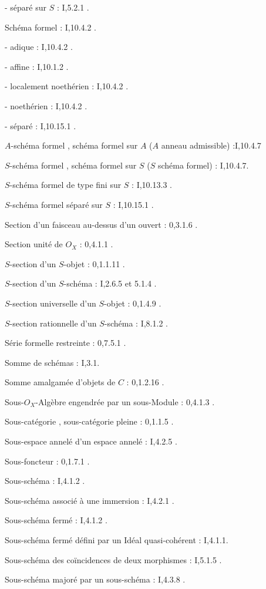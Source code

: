 - séparé sur $S$ : I,5.2.1 .

 Schéma formel : I,10.4.2 .

- adique : I,10.4.2 .

- affine : I,10.1.2 .

- localement noethérien : I,10.4.2 .

- noethérien : I,10.4.2 .

- séparé : I,10.15.1 .

$A$-schéma formel , schéma formel sur $A$ ($A$ anneau admissible) :I,10.4.7

$S$-schéma formel , schéma formel sur $S$ ($S$ schéma formel) : I,10.4.7.

$S$-schéma formel de type fini sur $S$ : I,10.13.3 .

$S$-schéma formel séparé sur $S$ : I,10.15.1 .

Section d'un faisceau au-dessus d'un ouvert : 0,3.1.6 .

Section unité de $O_X$ : 0,4.1.1 .

$S$-section d'un $S$-objet : 0,1.1.11 .

$S$-section d'un $S$-schéma : I,2.6.5 et 5.1.4 .

$S$-section universelle d'un $S$-objet : 0,1.4.9 .

$S$-section rationnelle d'un $S$-schéma : I,8.1.2 .

Série formelle restreinte : 0,7.5.1 .

Somme de schémas :  I,3.1.

Somme amalgamée d'objets de \uline{$C$} : 0,1.2.16 .

Sous-$O_X$-Algèbre engendrée par un sous-Module : 0,4.1.3 .

Sous-catégorie , sous-catégorie  pleine : 0,1.1.5 .

Sous-espace annelé d'un espace annelé : I,4.2.5 .

 Sous-foncteur : 0,1.7.1 .

Sous-schéma : I,4.1.2 .

Sous-schéma associé à une immersion : I,4.2.1 .

Sous-schéma fermé : I,4.1.2 .

Sous-schéma fermé défini par un Idéal quasi-cohérent : I,4.1.1.

Sous-schéma des coïncidences de deux morphismes : I,5.1.5 .

Sous-schéma majoré par un sous-schéma : I,4.3.8 .

